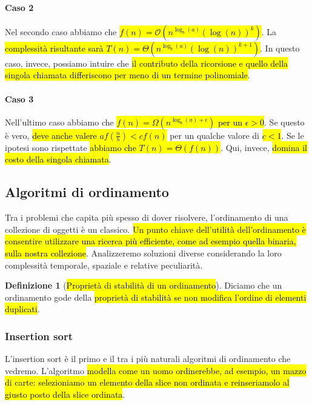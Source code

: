 \documentclass[a4paper,11pt,oneside]{article}
\theoremstyle{plain}
\theoremstyle{definition}
\newtheorem{defn}{Definizione}[section]
\theoremstyle{remark}
\begin{document}
\paragraph{Caso 2} Nel secondo caso abbiamo che \hl{$f(n) =
\mathcal{O}(n^{\log_b(a)}{(\log(n))}^k)$}. La \hl{complessità risultante sarà
$T(n) = \Theta(n^{\log_b(a)}{(\log(n))}^{k+1})$}. In questo caso, invece,
possiamo intuire che \hl{il contributo della ricorsione e quello della singola
chiamata differiscono per meno di un termine polinomiale}.

\paragraph{Caso 3} Nell'ultimo caso abbiamo che \hl{$f(n) = \Omega(n^{\log_b(a)
+ \epsilon})$ per un $\epsilon >0$}. Se questo è vero, \hl{deve anche valere
$af(\frac{n}{b})<cf(n)$} per un qualche valore di \hl{$c<1$}. Se le ipotesi sono
rispettate \hl{abbiamo che $T(n) = \Theta(f(n))$}. Qui, invece, \hl{domina il
costo della singola chiamata}.

\subsection{Algoritmi di ordinamento}\label{sec:alg-odinamento}

Tra i problemi che capita più spesso di dover risolvere, l'ordinamento di una
collezione di oggetti è un classico. \hl{Un punto chiave dell'utilità
dell'ordinamento è consentire utilizzare una ricerca più efficiente, come ad
esempio quella binaria, sulla nostra collezione}. Analizzeremo soluzioni diverse
considerando la loro complessità temporale, spaziale e relative peculiarità.

\begin{defn}[\hl{Proprietà di stabilità di un ordinamento}]\label{def:prop-stabilita}
  Diciamo che un ordinamento gode della \hl{proprietà di stabilità se non
  modifica l'ordine di elementi duplicati}.
\end{defn}

\subsubsection{Insertion sort}\label{sec:insertion-sort}

L'insertion sort è il primo e il tra i più naturali algoritmi di ordinamento che
vedremo. L'algoritmo \hl{modella come un uomo ordinerebbe, ad esempio, un mazzo
di carte: selezioniamo un elemento della slice non ordinata e reinseriamolo al
giusto posto della slice ordinata}.
\end{document}
